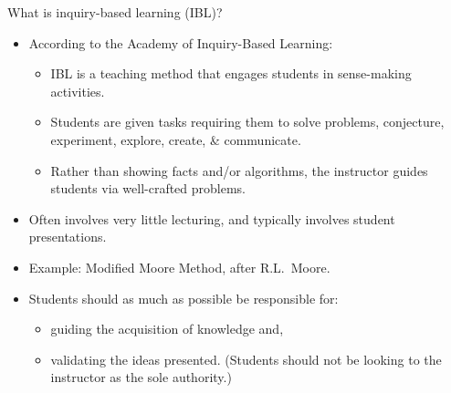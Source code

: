 \documentclass[10pt]{beamer}
\begin{document}
\begin{frame}

\begin{block}{What is inquiry-based learning (IBL)?}
\begin{itemize}
\item<2-> According to the \alert{Academy of Inquiry-Based Learning}:
\begin{itemize}\normalsize
\item<2-> IBL is a teaching method that engages students in sense-making activities.
\item Students are given tasks requiring them to solve problems, conjecture, experiment, explore, create, \& communicate.
\item<2-> Rather than showing facts and/or algorithms, the instructor guides students via well-crafted problems. \pause
\end{itemize}
\item<3-> Often involves very little lecturing, and typically involves student presentations.\pause
\item<4-> Example: Modified Moore Method, after R.L.~Moore. \pause
\item<5-> Students should as much as possible be responsible for:
\begin{itemize}\normalsize
\item<6-> guiding the acquisition of knowledge and,
\item<6-> validating the ideas presented. (Students should not be looking to the instructor as the sole authority.)
\end{itemize}
\end{itemize}
\end{block}

\end{frame}

\end{document}
